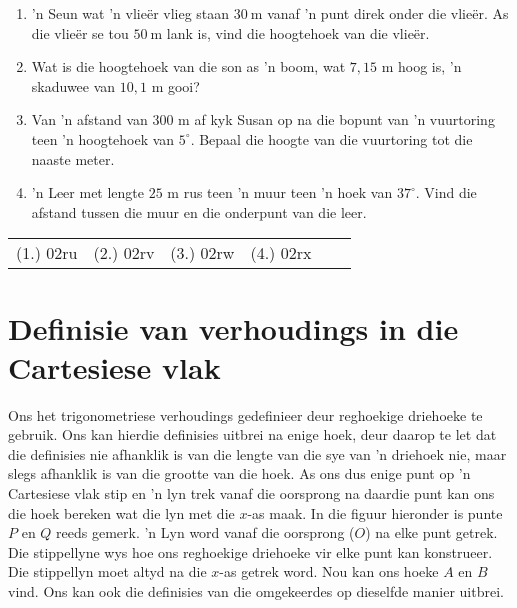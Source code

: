 \begin{exercises}{}
{
\begin{enumerate}[noitemsep, label=\textbf{\arabic*}. ] 

\item 'n Seun wat 'n vlie\"er vlieg staan $30~$m vanaf 'n punt direk onder die vlie\"er. As die vlie\"er se tou $50~$m lank is, vind die hoogtehoek van die vlie\"er.
\item Wat is die hoogtehoek van die son as 'n boom, wat $7,15$ m hoog is, 'n skaduwee van $10,1$ m gooi?
\item Van 'n afstand van $300$ m af kyk Susan op na die bopunt van 'n vuurtoring teen 'n hoogtehoek van $5^{\circ}$. Bepaal die hoogte van die vuurtoring tot die naaste meter.
\item 'n Leer met lengte $25$ m rus teen 'n muur teen 'n hoek van $37^{\circ}$. Vind die afstand tussen die muur en die onderpunt van die leer. 

\end{enumerate}

\par \practiceinfo
\par \begin{tabular}[h]{cccccc}
(1.)	02ru	&
(2.)	02rv	&
(3.)	02rw	&
(4.)	02rx	&
\end{tabular}
    
}
\end{exercises} 



\section{Definisie van verhoudings in die Cartesiese vlak}

Ons het trigonometriese verhoudings gedefinieer deur reghoekige driehoeke te gebruik. Ons kan hierdie definisies uitbrei na enige hoek, deur daarop te let dat die definisies nie afhanklik is van die lengte van die sye van 'n driehoek nie, maar slegs afhanklik is van die grootte van die hoek. As ons dus enige punt op 'n Cartesiese vlak stip en 'n lyn trek vanaf die oorsprong na daardie punt kan ons die hoek bereken wat die lyn met die $x$-as maak. In die figuur hieronder is punte $P$ en $Q$ reeds gemerk. 'n Lyn word vanaf die oorsprong ($O$) na elke punt getrek. Die stippellyne wys hoe ons reghoekige driehoeke vir elke punt kan konstrueer. Die stippellyn moet altyd na die $x$-as getrek word. Nou kan ons hoeke $A$ en $B$ vind. Ons kan ook die definisies van die omgekeerdes op dieselfde manier uitbrei.



